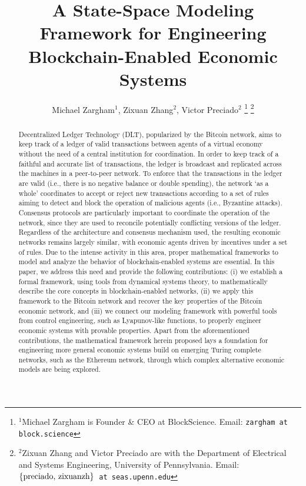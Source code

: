 \documentclass[letterpaper, 10 pt, conference]{ieeeconf}  %
\author{Michael Zargham$^{1}$, Zixuan Zhang$^{2}$, Victor Preciado$^{2}$%
\thanks{$^{1}$Michael Zargham is Founder \& CEO at BlockScience. Email:
        {\tt\small zargham at block.science}}%
\thanks{$^{2}$Zixuan Zhang and Victor Preciado are with the Department of Electrical and Systems
Engineering, University of Pennsylvania. Email:
        {\tt\small $\{\hbox{preciado, zixuanzh}\}$  at seas.upenn.edu}}%
}%
\title{A State-Space Modeling Framework for Engineering Blockchain-Enabled Economic Systems}
\begin{document}
\maketitle

\begin{abstract}


Decentralized Ledger Technology (DLT), popularized by the Bitcoin network, aims to keep track of a ledger of valid transactions between agents of a virtual economy without the need of a central institution for coordination. In order to keep track of a faithful and accurate list of transactions, the ledger is broadcast and replicated across the machines in a peer-to-peer network. To enforce that the transactions in the ledger are valid (i.e., there is no negative balance or double spending), the network ‘as a whole’ coordinates to accept or reject new transactions according to a set of rules aiming to detect and block the operation of malicious agents (i.e., Byzantine attacks).
Consensus protocols are particularly important to coordinate the operation of the network, since they are used to reconcile potentially conflicting versions of the ledger. Regardless of the architecture and consensus mechanism used, the resulting economic networks remains largely similar, with economic agents driven by incentives under a set of rules.
Due to the intense activity in this area, proper mathematical frameworks to model and analyze the behavior of blockchain-enabled systems are essential. In this paper, we address this need and provide the following contributions: (i) we establish a formal framework, using tools from dynamical systems theory, to mathematically describe the core concepts in blockchain-enabled networks, (ii) we apply this framework to the Bitcoin network and recover the key properties of the Bitcoin economic network, and (iii) we connect our modeling framework with powerful tools from control engineering, such as Lyapunov-like functions, to properly engineer economic systems with provable properties.
Apart from the aforementioned contributions, the mathematical framework herein proposed lays a foundation for engineering more general economic systems build on emerging Turing complete networks, such as the Ethereum network, through which complex alternative economic models are being explored.




\end{abstract}
\end{document}
